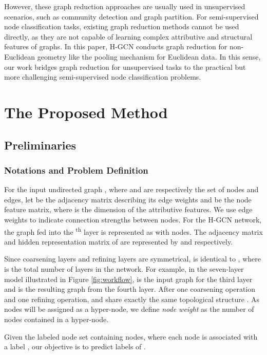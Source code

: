\documentclass{article}
\begin{document}
However, these graph reduction approaches are usually used in unsupervised scenarios, such as community detection and graph partition. For semi-supervised node classification tasks, existing graph reduction methods cannot be used directly, as they are not capable of learning complex attributive and structural features of graphs. In this paper, H-GCN conducts graph reduction for non-Euclidean geometry like the pooling mechanism for Euclidean data. In this sense, our work bridges graph reduction for unsupervised tasks to the practical but more challenging semi-supervised node classification problems.
 \section{The Proposed Method}

\subsection{Preliminaries}

\subsubsection{Notations and Problem Definition}

For the input undirected graph , where  and  are respectively the set of  nodes and  edges, let  be the adjacency matrix describing its edge weights and  be the node feature matrix, where  is the dimension of the attributive features. We use edge weights to indicate connection strengths between nodes. For the H-GCN network, the graph fed into the \textsuperscript{th} layer is represented as  with  nodes. The adjacency matrix and hidden representation matrix of  are represented by  and  respectively.

Since coarsening layers and refining layers are symmetrical,  is identical to , where  is the total number of layers in the network. For example, in the seven-layer model illustrated in Figure \ref{fig:workflow},  is the input graph for the third layer and  is the resulting graph from the fourth layer. After one coarsening operation and one refining operation,  and  share exactly the same topological structure . As nodes will be assigned as a hyper-node, we define {\it node weight} as the number of nodes contained in a hyper-node.

Given the labeled node set  containing  nodes, where each node  is associated with a label , our objective is to predict labels of .
\end{document}
